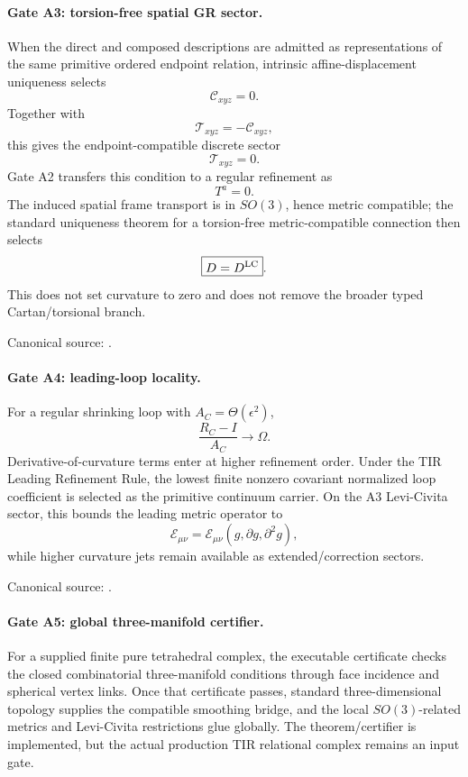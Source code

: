\paragraph{Gate A3: torsion-free spatial GR sector.}
When the direct and composed descriptions are admitted as representations of
the same primitive ordered endpoint relation, intrinsic affine-displacement
uniqueness selects
\[
\mathcal C_{xyz}=0.
\]
Together with
\[
\mathcal T_{xyz}=-\mathcal C_{xyz},
\]
this gives the endpoint-compatible discrete sector
\[
\mathcal T_{xyz}=0.
\]
Gate A2 transfers this condition to a regular refinement as
\[
\boxed{T^a=0}.
\]
The induced spatial frame transport is in \(SO(3)\), hence metric compatible;
the standard uniqueness theorem for a torsion-free metric-compatible
connection then selects
\[
\boxed{D=D^{\rm LC}}.
\]
This does not set curvature to zero and does not remove the broader typed
Cartan/torsional branch.

Canonical source:
.

\paragraph{Gate A4: leading-loop locality.}
For a regular shrinking loop with \(A_C=\Theta(\epsilon^2)\),
\[
\frac{R_C-I}{A_C}\longrightarrow\Omega.
\]
Derivative-of-curvature terms enter at higher refinement order.  Under the TIR
Leading Refinement Rule, the lowest finite nonzero covariant normalized loop
coefficient is selected as the primitive continuum carrier.  On the A3
Levi-Civita sector, this bounds the leading metric operator to
\[
\mathcal E_{\mu\nu}
=\mathcal E_{\mu\nu}(g,\partial g,\partial^2g),
\]
while higher curvature jets remain available as extended/correction sectors.

Canonical source:
.

\paragraph{Gate A5: global three-manifold certifier.}
For a supplied finite pure tetrahedral complex, the executable certificate
checks the closed combinatorial three-manifold conditions through face
incidence and spherical vertex links.  Once that certificate passes, standard
three-dimensional topology supplies the compatible smoothing bridge, and the
local \(SO(3)\)-related metrics and Levi-Civita restrictions glue globally.
The theorem/certifier is implemented, but the actual production TIR relational
complex remains an input gate.


